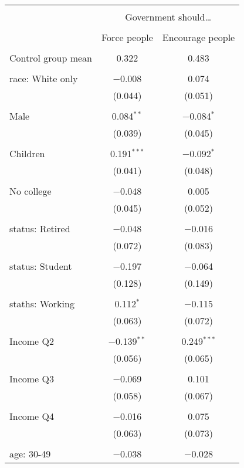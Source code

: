 
\begin{tabular}{@{\extracolsep{5pt}}lcc} 
\\[-1.8ex]\hline 
\hline \\[-1.8ex] 
 & \multicolumn{2}{c}{Government should…} \\ 
\cline{2-3} 
\\[-1.8ex] & Force people & Encourage people \\ 
\hline \\[-1.8ex] 
 Control group mean & 0.322 & 0.483  \\ \hline \\[-1.8ex] race: White only & $-$0.008 & 0.074 \\ 
  & (0.044) & (0.051) \\ 
  & & \\ 
 Male & 0.084$^{**}$ & $-$0.084$^{*}$ \\ 
  & (0.039) & (0.045) \\ 
  & & \\ 
 Children & 0.191$^{***}$ & $-$0.092$^{*}$ \\ 
  & (0.041) & (0.048) \\ 
  & & \\ 
 No college & $-$0.048 & 0.005 \\ 
  & (0.045) & (0.052) \\ 
  & & \\ 
 status: Retired & $-$0.048 & $-$0.016 \\ 
  & (0.072) & (0.083) \\ 
  & & \\ 
 status: Student & $-$0.197 & $-$0.064 \\ 
  & (0.128) & (0.149) \\ 
  & & \\ 
 staths: Working & 0.112$^{*}$ & $-$0.115 \\ 
  & (0.063) & (0.072) \\ 
  & & \\ 
 Income Q2 & $-$0.139$^{**}$ & 0.249$^{***}$ \\ 
  & (0.056) & (0.065) \\ 
  & & \\ 
 Income Q3 & $-$0.069 & 0.101 \\ 
  & (0.058) & (0.067) \\ 
  & & \\ 
 Income Q4 & $-$0.016 & 0.075 \\ 
  & (0.063) & (0.073) \\ 
  & & \\ 
 age: 30-49 & $-$0.038 & $-$0.028 \\ 

\end{tabular}
